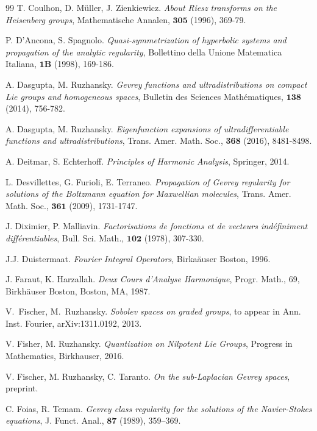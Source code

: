 \documentclass[12pt,oneside,a4paper]{book}
\numberwithin{equation}{section}     %
\theoremstyle{plain}
\theoremstyle{definition}
\begin{document}
\begin{thebibliography}{99}
	T. Coulhon, D. M\"uller, J. Zienkiewicz. 
	\emph{About Riesz transforms on the Heisenberg groups},
	Mathematische Annalen, $\mathbf{305}$ (1996), 369-79.
	
	P. D'Ancona, S. Spagnolo.
	\emph{Quasi-symmetrization of hyperbolic systems and propagation of the analytic regularity}, 
	Bollettino della Unione Matematica Italiana, $\mathbf{1 B}$ (1998), 169-186.
	
	A. Dasgupta, M. Ruzhansky.
	\emph{Gevrey functions and ultradistributions on compact Lie groups and homogeneous spaces},
	Bulletin des Sciences Math\'ematiques, $\mathbf{138}$ (2014), 756-782.
	
	A. Dasgupta, M. Ruzhansky.
	\emph{Eigenfunction expansions of ultradifferentiable functions and ultradistributions}, 
	Trans. Amer. Math. Soc., {\bf 368} (2016), 8481-8498.
	
	A. Deitmar, S. Echterhoff.
	\emph{Principles of Harmonic Analysis},
	Springer, 2014.
	
	L. Desvillettes, G. Furioli, E. Terraneo.
	\emph{Propagation of Gevrey regularity for solutions of the Boltzmann equation for Maxwellian molecules},
	Trans. Amer. Math. Soc., $\mathbf{361}$ (2009), 1731-1747.
	
	J. Diximier, P. Malliavin.
	\emph{Factorisations de fonctions et de vecteurs ind\'efiniment diff\'erentiables},
	Bull. Sci. Math., $\mathbf{102}$ (1978), 307-330. 
	
	J.J. Duistermaat.
	\emph{Fourier Integral Operators},
	Birka\"auser Boston, 1996.
	
	J. Faraut, K. Harzallah.
	\emph{Deux Cours d'Analyse Harmonique},
	Progr. Math., 69, Birkh\"auser Boston, Boston, MA, 
	1987.
	
	V.~Fischer, M.~Ruzhansky. 
	\emph{Sobolev spaces on graded groups},
	to appear in Ann. Inst. Fourier, arXiv:1311.0192, 2013.
	
	V. Fisher, M. Ruzhansky.
	\emph{Quantization on Nilpotent Lie Groups}, 
	Progress in Mathematics,  Birkhauser, 2016.
	
	V. Fischer, M. Ruzhansky, C. Taranto.
	\emph{On the sub-Laplacian Gevrey spaces}, preprint. 
	
	C. Foias, R. Temam. 
	\emph{Gevrey class regularity for the solutions of the Navier-Stokes equations},
	J. Funct. Anal., $\mathbf{87}$ (1989), 359–369.
	

\end{thebibliography}
\end{document}
